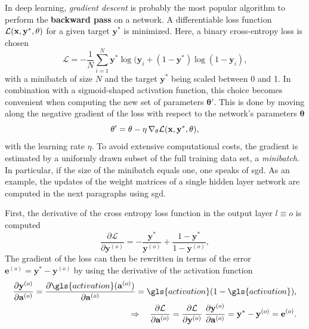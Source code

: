 In deep learning, \emph{gradient descent} is probably the most popular algorithm to perform the \textbf{backward pass} on a network. A differentiable loss function $\mathcal{L}(\mathbf{\mathbf{x}, y^*, \theta})$ for a given target $\textbf{y}^*$ is minimized. Here, a binary cross-entropy loss is chosen
\begin{equation*}
\mathcal{L} = - \frac{1}{N} \sum_{i=1}^N \textbf{y}^* \log(\textbf{y}_i + (1-\textbf{y}^*) \log(1 - \textbf{y}_i), 
\end{equation*}
with a minibatch of size $N$ and the target $\textbf{y}^*$ being scaled between 0 and 1. In combination with a sigmoid-shaped activation function, this choice becomes convenient when computing the new set of parameters $\mathbf{\theta}'$. This is done by moving along the negative gradient of the loss with respect to the network's parameters $\mathbf{\theta}$
\begin{equation}
\mathbf{\theta'} = \mathbf{\theta} - \eta \, \nabla_\theta\mathcal{L}(\mathbf{\mathbf{x}, y^*, \mathbf{\theta}}),
\label{stochasticgradientdescent}
\end{equation}
with the learning rate $\eta$. To avoid extensive computational costs, the gradient is estimated by a uniformly drawn subset of the full training data set, a \emph{minibatch}. In particular, if the size of the minibatch equals one, one speaks of \gls{sgd}. As an example, the updates of the weight matrices of a single hidden layer network are computed in the next paragraphs using \gls{sgd}.

First, the derivative of the cross entropy loss function in the output layer $l\equiv o$ is computed
\begin{equation*}
\frac{\partial\mathcal{L}}{\partial \mathbf{y}^{(o)}} = 
- \frac{\mathbf{y}^*}{\mathbf{y}^{(o)}} + 
\frac{1 - \mathbf{y}^*}{1 - \mathbf{y}^{(o)}},
\end{equation*}
The gradient of the loss can then be rewritten in terms of the error $\mathbf{e}^{(o)} = \mathbf{y}^* - \mathbf{y}^{(o)}$ by using the derivative of the activation function
\begin{align*}
\frac{\partial \mathbf{y}^{(o)}}{\partial \mathbf{a}^{(o)}} = \frac{\partial \gls{activation}(\mathbf{a}^{(o)})}{\partial \mathbf{a}^{(o)}} = \gls{activation} (1 - \gls{activation}),\\
\Rightarrow \quad \frac{\partial\mathcal{L}}{\partial \mathbf{a}^{(o)}} =
\frac{\partial\mathcal{L}}{\partial \mathbf{y}^{(o)}} 
\; \frac{\partial \mathbf{y}^{(o)}}{\partial \mathbf{a}^{(o)}} =
\mathbf{y}^* - \mathbf{y}^{(o)} = \mathbf{e}^{(o)}.
\end{align*}


